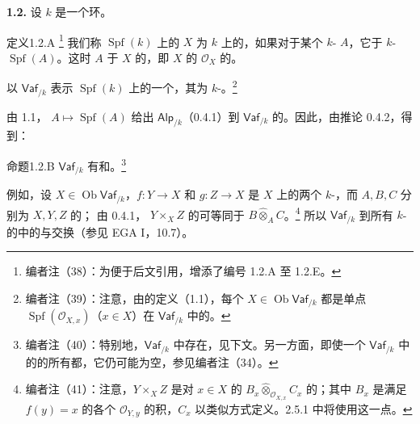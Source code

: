\textbf{1.2.} 设 $k$ 是一个环。
\begin{SGAresult}{定义}{1.2.A}
\footnote{编者注（38）：为便于后文引用，增添了编号 1.2.A 至 1.2.E。}
我们称 $\operatorname{Spf}(k)$ 上的 $X$ 为 $k$ 上的，如果对于某个 $k$- $A$，它于 $k$- $\operatorname{Spf}(A)$。这时 $A$ 于 $X$ 的，即 $X$ 的 $\mathcal O_X$ 的。

以 $\mathsf{Vaf}_{/k}$ 表示 $\operatorname{Spf}(k)$ 上的一个，其为 $k$-。\footnote{编者注（39）：注意，由的定义（1.1），每个 $X\in\operatorname{Ob}\mathsf{Vaf}_{/k}$ 都是单点 $\operatorname{Spf}(\mathcal O_{X,x})$（$x\in X$）在 $\mathsf{Vaf}_{/k}$ 中的。}
\end{SGAresult}
由 1.1， $A\mapsto\operatorname{Spf}(A)$ 给出 $\mathsf{Alp}_{/k}$（0.4.1）到 $\mathsf{Vaf}_{/k}$ 的。因此，由推论 0.4.2，得到：
\begin{SGAresult}{命题}{1.2.B}
 $\mathsf{Vaf}_{/k}$ 有和。\footnote{编者注（40）：特别地，$\mathsf{Vaf}_{/k}$ 中存在，见下文。另一方面，即使一个 $\mathsf{Vaf}_{/k}$ 中的的所有都，它仍可能为空，参见编者注（34）。}
\end{SGAresult}
例如，设 $X\in\operatorname{Ob}\mathsf{Vaf}_{/k}$，$f:Y\to X$ 和 $g:Z\to X$ 是 $X$ 上的两个 $k$-，而 $A,B,C$ 分别为 $X,Y,Z$ 的；
由 0.4.1， $Y\times_X Z$ 的可等同于 $B\widehat\otimes_A C$。\footnote{编者注（41）：注意，$Y\times_X Z$ 是对 $x\in X$ 的 $B_x\widehat\otimes_{\mathcal O_{X,x}}C_x$ 的；其中 $B_x$ 是满足 $f(y)=x$ 的各个 $\mathcal O_{Y,y}$ 的积，$C_x$ 以类似方式定义。2.5.1 中将使用这一点。} 所以 $\mathsf{Vaf}_{/k}$ 到所有 $k$-的中的与交换（参见 EGA I，10.7）。

